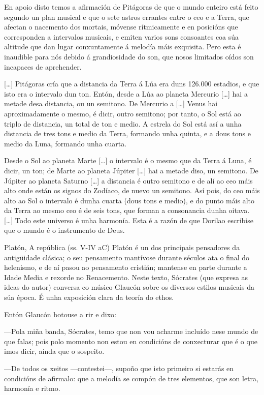 En apoio disto temos a afirmación de Pitágoras de que o mundo enteiro está feito segundo un plan musical e que o sete astros errantes entre o ceo e a Terra, que afectan o nacemento dos mortais, móvense rítmicamente e en posicións que corresponden a intervalos musicais, e emiten varios sons consoantes coa súa altitude que dan lugar conxuntamente á melodía máis exquisita. Pero esta é inaudible para nós debido á grandiosidade do son, que nosos limitados oídos son incapaces de aprehender.

[…] Pitágoras cría que a distancia da Terra á Lúa era duns 126.000 estadios, e que isto era o intervalo dun ton. Entón, desde a Lúa ao planeta Mercurio […] hai a metade desa distancia, ou un semitono. De Mercurio a […] Venus hai aproximadamente o mesmo, é dicir, outro semitono; por tanto, o Sol está ao triplo de distancia, un total de ton e medio. A estrela do Sol está así a unha distancia de tres tons e medio da Terra, formando unha quinta, e a dous tons e medio da Luna, formando unha cuarta.

Desde o Sol ao planeta Marte […] o intervalo é o mesmo que da Terra á Luna, é dicir, un ton; de Marte ao planeta Júpiter […] hai a metade diso, un semitono. De Júpiter ao planeta Saturno […] a distancia é outro semitono e de alí ao ceo máis alto onde están os signos do Zodíaco, de nuevo un semitono. Así pois, do ceo máis alto ao Sol o intervalo é dunha cuarta (dous tons e medio), e do punto máis alto da Terra ao mesmo ceo é de seis tons, que forman a consonancia dunha oitava. […] Todo este universo é unha harmonía. Esta é a razón de que Dorilao escribise que o mundo é o instrumento de Deus.

Platón, A república (ss. V-IV aC)
Platón é un dos principais pensadores da antigüidade clásica; o seu pensamento mantívose durante séculos ata o final do helenismo, e de aí pasou ao pensamento cristián; mantense en parte durante a Idade Media e rexorde no Renacemento. Neste texto, Sócrates (que expresa as ideas do autor) conversa co músico Glaucón sobre os diversos estilos musicais da súa época. É unha exposición clara da teoría do ethos.

Entón Glaucón botouse a rir e dixo:

—Pola miña banda, Sócrates, temo que non vou acharme incluído nese mundo de que falas; pois polo momento non estou en condicións de conxecturar que é o que imos dicir, aínda que o sospeito.

—De todos os xeitos —contestei—, supoño que isto primeiro si estarás en condicións de afirmalo: que a melodía se compón de tres elementos, que son letra, harmonía e ritmo.

